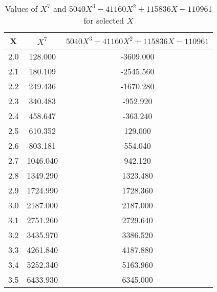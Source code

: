 ﻿%
\begin{table}[h!]
    \centering
    \caption{Values of $X^7$ and $5040X^3 - 41160X^2 + 115836X - 110961$ for selected $X$}
    \begin{tabular}{|c|c|c|}
        \hline
        \textbf{X} & \textbf{$X^7$} & \textbf{$5040X^3 - 41160X^2 + 115836X - 110961$} \\ \hline
        2.0        & 128.000        & -3609.000                                        \\ \hline
        2.1        & 180.109        & -2545.560                                        \\ \hline
        2.2        & 249.436        & -1670.280                                        \\ \hline
        2.3        & 340.483        & -952.920                                         \\ \hline
        2.4        & 458.647        & -363.240                                         \\ \hline
        2.5        & 610.352        & 129.000                                          \\ \hline
        2.6        & 803.181        & 554.040                                          \\ \hline
        2.7        & 1046.040       & 942.120                                          \\ \hline
        2.8        & 1349.290       & 1323.480                                         \\ \hline
        2.9        & 1724.990       & 1728.360                                         \\ \hline
        3.0        & 2187.000       & 2187.000                                         \\ \hline
        3.1        & 2751.260       & 2729.640                                         \\ \hline
        3.2        & 3435.970       & 3386.520                                         \\ \hline
        3.3        & 4261.840       & 4187.880                                         \\ \hline
        3.4        & 5252.340       & 5163.960                                         \\ \hline
        3.5        & 6433.930       & 6345.000                                         \\ \hline

\end{tabular}
\end{table}

